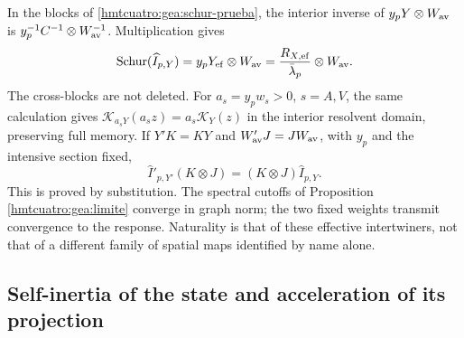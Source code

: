 In the blocks of \eqref{hmtcuatro:gea:schur-prueba}, the interior inverse of $y_pY\otimes W_{\rm av}$ is $y_p^{-1}C^{-1}\otimes W_{\rm av}^{-1}$. Multiplication gives
\begin{equation}
\operatorname{Schur}(\widehat I_{p,Y})
=y_pY_{\rm ef}\otimes W_{\rm av}
=\frac{R_{X,\rm ef}}{\bar\lambda_p}\otimes W_{\rm av}.
\label{hmtcuatro:gea:schur-autoinercia}
\end{equation}
The cross-blocks are not deleted. For $a_s=y_pw_s>0$, $s=A,V$, the same calculation gives $\mathcal K_{a_sY}(a_sz)=a_s\mathcal K_Y(z)$ in the interior resolvent domain, preserving full memory. If $Y'K=KY$ and $W'_{\rm av}J=JW_{\rm av}$, with $y_p$ and the intensive section fixed,
\begin{equation}
\widehat I'_{p,Y'}(K\otimes J)
=(K\otimes J)\widehat I_{p,Y}.
\label{hmtcuatro:gea:naturalidad}
\end{equation}
This is proved by substitution. The spectral cutoffs of Proposition \ref{hmtcuatro:gea:limite} converge in graph norm; the two fixed weights transmit convergence to the response. Naturality is that of these effective intertwiners, not that of a different family of spatial maps identified by name alone.

\subsection{Self-inertia of the state and acceleration of its projection}
\label{hmtcuatro:gea:proyeccion}

